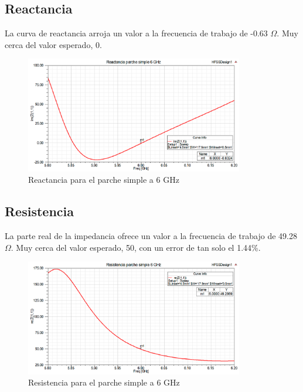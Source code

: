 \subsection{Reactancia}
\par La curva de reactancia arroja un valor a la frecuencia de trabajo de -0.63 $\Omega$. Muy cerca del valor esperado, 0.
\\
\begin{figure}[H]
    \centering
        \includegraphics[width=0.85\textwidth]{archivos/analisis/1x12/2}
        \caption{Reactancia para el parche simple a 6 GHz}
        \label{fig:react1x12}
\end{figure}


\subsection{Resistencia}
\par La parte real de la impedancia ofrece un valor a la frecuencia de trabajo de 49.28 $\Omega$. Muy cerca del valor esperado, 50, con un error de tan solo el 1.44\%.
\\
\begin{figure}[H]
    \centering
        \includegraphics[width=0.85\textwidth]{archivos/analisis/1x12/3}
        \caption{Resistencia para el parche simple a 6 GHz}
        \label{fig:resis1x12}
\end{figure}


